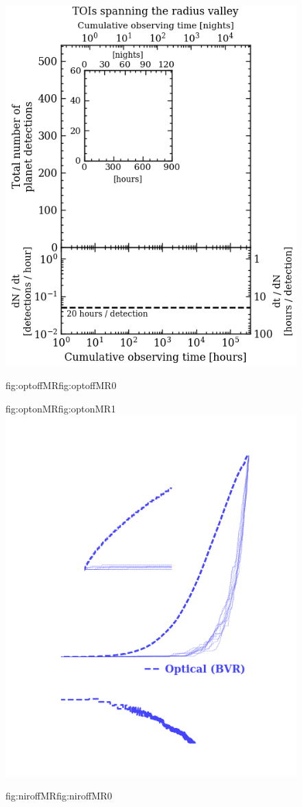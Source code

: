 \begin{figure}
  \centering
  \includegraphics[width=0.6\hsize]{figures/cumulativetobsGP_radvalley_bkgd.png}%
  \hspace{-0.6\hsize}%
  \begin{ocg}{fig:optoffMR}{fig:optoffMR}{0}%
  \end{ocg}%
  \begin{ocg}{fig:optonMR}{fig:optonMR}{1}%
  \includegraphics[width=0.6\hsize]{figures/cumulativetobsGP_radvalley_opt.png}%
  \end{ocg}
  \hspace{-0.6\hsize}%
  \begin{ocg}{fig:niroffMR}{fig:niroffMR}{0}%
  \end{ocg}%

\end{figure}
